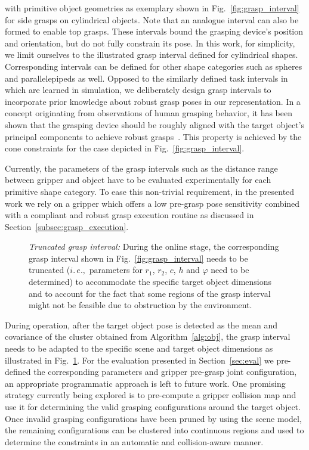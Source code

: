 with primitive object geometries as exemplary shown in Fig.~\ref{fig:grasp_interval} for side grasps
on cylindrical objects. Note that an analogue interval can also be formed to enable top
grasps. These intervals bound the grasping device's position and orientation, but do not fully
constrain its pose. In this work, for simplicity, we limit ourselves to the illustrated grasp
interval defined for cylindrical shapes. Corresponding intervals can be defined for other shape
categories such as spheres and parallelepipeds as well. Opposed to the similarly defined task
intervals in~\cite{Gien08a, Gien08b} which are learned in simulation, we deliberately design grasp
intervals to incorporate prior knowledge about robust grasp poses in our representation. In a
concept originating from observations of human grasping behavior, it has been shown that the
grasping device should be roughly aligned with the target object's principal components to achieve
robust grasps~\cite{Bala12}. This property is achieved by the cone constraints for the case depicted
in Fig.~\ref{fig:grasp_interval}.

Currently, the parameters of the grasp intervals such as the distance range between gripper and
object have to be evaluated experimentally for each primitive shape category. To ease this
non-trivial requirement, in the presented work we rely on a gripper which offers a low pre-grasp
pose sensitivity combined with a compliant and robust grasp execution routine as discussed in
Section~\ref{subsec:grasp_execution}.
%
\begin{figure}[t!] 
   \centering
    \def\svgwidth{235pt} 
     
    \caption{\textit{Truncated grasp interval:} During the online stage, the corresponding grasp
      interval shown in Fig.~\ref{fig:grasp_interval} needs to be truncated ($i.\,e.,$ parameters
      for $r_1$, $r_2$, $c$, $h$ and $\varphi$ need to be determined) to accommodate the specific
      target object dimensions and to account for the fact that some regions of the grasp interval
      might not be feasible due to obstruction by the environment.}
   \label{fig:truncated_grasp_interval}
   \vspace{-0.5cm}
\end{figure}

During operation, after the target object pose is detected as the mean and covariance of the cluster
obtained from Algorithm~\ref{alg:obj}, the grasp interval needs to be adapted to the specific scene
and target object dimensions as illustrated in Fig.~\ref{fig:truncated_grasp_interval}. For the
evaluation presented in Section~\ref{sec:eval} we pre-defined the corresponding parameters and
gripper pre-grasp joint configuration, an appropriate programmatic approach is left to future work.
One promising strategy currently being explored is to pre-compute a gripper collision map and use it
for determining the valid grasping configurations around the target object. Once invalid grasping
configurations have been pruned by using the scene model, the remaining configurations can be
clustered into continuous regions and used to determine the constraints in an automatic and
collision-aware manner.
%
